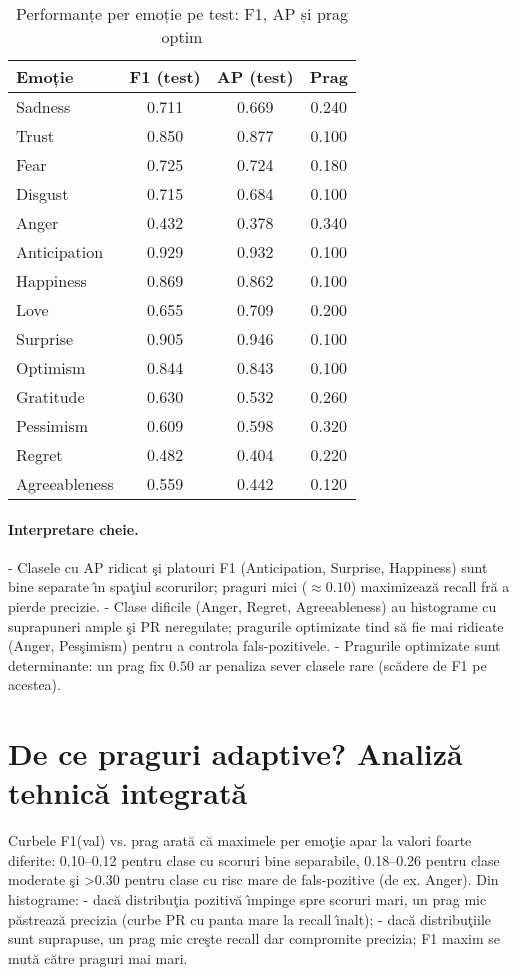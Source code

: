 \begin{table}[tb]\centering
\caption{Performanțe per emoție pe test: F1, AP și prag optim}
\label{tab:c6-per-label}
\begin{tabular}{lccc}
\toprule
Emoție & F1 (test) & AP (test) & Prag \\
\midrule
Sadness & 0.711 & 0.669 & 0.240 \\
Trust & 0.850 & 0.877 & 0.100 \\
Fear & 0.725 & 0.724 & 0.180 \\
Disgust & 0.715 & 0.684 & 0.100 \\
Anger & 0.432 & 0.378 & 0.340 \\
Anticipation & 0.929 & 0.932 & 0.100 \\
Happiness & 0.869 & 0.862 & 0.100 \\
Love & 0.655 & 0.709 & 0.200 \\
Surprise & 0.905 & 0.946 & 0.100 \\
Optimism & 0.844 & 0.843 & 0.100 \\
Gratitude & 0.630 & 0.532 & 0.260 \\
Pessimism & 0.609 & 0.598 & 0.320 \\
Regret & 0.482 & 0.404 & 0.220 \\
Agreeableness & 0.559 & 0.442 & 0.120 \\
\bottomrule
\end{tabular}
\end{table}

\paragraph{Interpretare cheie.}
- Clasele cu AP ridicat \c{s}i platouri F1 (Anticipation, Surprise, Happiness) sunt bine separate \^{\i}n spa\c{t}iul scorurilor; praguri mici ($\approx 0.10$) maximizeaz\u{a} recall fr\u{a} a pierde precizie.
- Clase dificile (Anger, Regret, Agreeableness) au histograme cu suprapuneri ample \c{s}i PR neregulate; pragurile optimizate tind s\u{a} fie mai ridicate (Anger, Pes\c{s}imism) pentru a controla fals-pozitivele.
- Pragurile optimizate sunt determinante: un prag fix $0.50$ ar penaliza sever clasele rare (sc\u{a}dere de F1 pe acestea).

\section{De ce praguri adaptive? Analiz\u{a} tehnic\u{a} integrat\u{a}}
Curbele F1(val) vs. prag arat\u{a} c\u{a} maximele per emo\c{t}ie apar la valori foarte diferite: 0.10--0.12 pentru clase cu scoruri bine separabile, 0.18--0.26 pentru clase moderate \c{s}i >0.30 pentru clase cu risc mare de fals-pozitive (de ex. Anger). Din histograme:
- dac\u{a} distribu\c{t}ia pozitiv\u{a} \^{\i}mpinge spre scoruri mari, un prag mic p\u{a}streaz\u{a} precizia (curbe PR cu panta mare la recall \^{\i}nalt);
- dac\u{a} distribu\c{t}iile sunt suprapuse, un prag mic cre\c{s}te recall dar compromite precizia; F1 maxim se mut\u{a} c\u{a}tre praguri mai mari.

